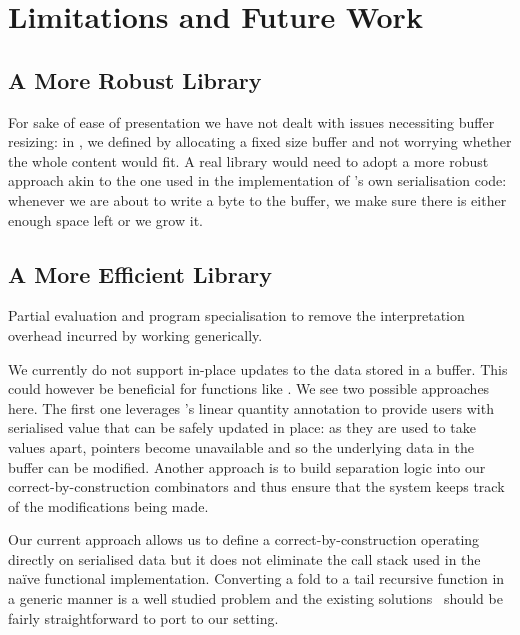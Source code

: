 \section{Limitations and Future Work}

\subsection{A More Robust Library}

For sake of ease of presentation we have not dealt with issues necessiting
buffer resizing: in ,
we defined 
by allocating a fixed size buffer and not worrying whether the whole content
would fit.
%
A real library would need to adopt a more robust approach
akin to the one used in the implementation of \idris{}'s own serialisation
code: whenever we are about to write a byte to the buffer, we make sure there
is either enough space left or we grow it.

\subsection{A More Efficient Library}

Partial evaluation and program specialisation to remove the interpretation
overhead incurred by working generically.

We currently do not support in-place updates to the data stored in a buffer.
This could however be beneficial for functions like .
%
We see two possible approaches here. The first one leverages \idris{}'s
linear quantity annotation to provide users with serialised value that
can be safely updated in place: as they are used to take values apart,
pointers become unavailable and so the underlying data in the buffer can
be modified.
%
Another approach is to build separation logic into our correct-by-construction
combinators and thus ensure that the system keeps track of the modifications
being made.



Our current approach allows us to define a correct-by-construction
 operating directly on serialised data but it
does not eliminate the call stack used in the naïve functional
implementation.
%
Converting a fold to a tail recursive function in a generic manner
is a well studied problem and the existing
solutions~\cite{DBLP:conf/popl/McBride08,DBLP:conf/icfp/CortinasS18}
should be fairly straightforward to port to our setting.


